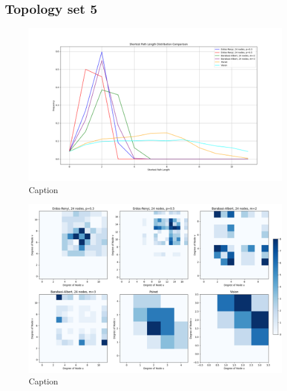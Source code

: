 \subsection{Topology set 5}
\begin{figure}
    \centering
    \includegraphics[width=0.9\linewidth]{images/FINAL-TOPO-COMP/line-24.png}
    \caption{Caption}
    \label{fig:enter-label}
\end{figure}

\begin{figure}
    \centering
    \includegraphics[width=0.9\linewidth]{images/FINAL-TOPO-COMP/Degree-correlation-matrices/24-matrix.png}
    \caption{Caption}
    \label{fig:enter-label}
\end{figure}

